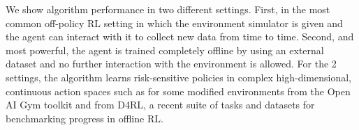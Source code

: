 We show algorithm performance in two different settings.
First, in the most common off-policy RL setting in which the environment simulator is given and
the agent can interact with it to collect new data from time to time.
Second, and most powerful, the agent is trained completely offline by using an external
dataset and no further interaction with the environment is allowed.
For the 2 settings, the algorithm learns risk-sensitive policies in
complex high-dimensional, continuous action spaces
such as for some modified environments from the Open AI Gym toolkit and from D4RL,
a recent suite of tasks and datasets for benchmarking progress in offline RL.







